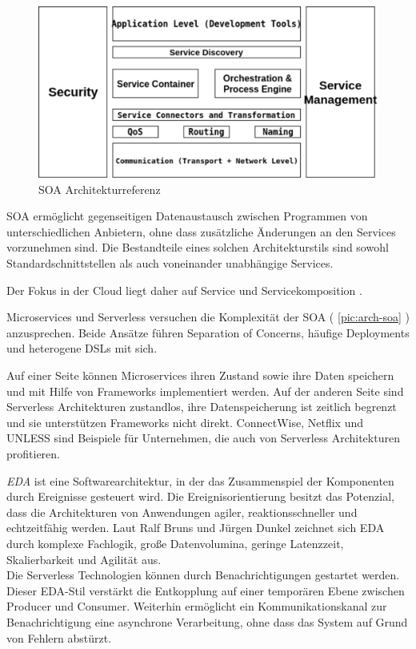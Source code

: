\documentclass[
12pt,
english,
ngerman,
headsepline,
twoside,
openright,
numbers=noenddot,version=first
]{scrreprt}
\begin{document}
\begin{figure}[H]
	\centering	
	\includegraphics[scale=0.80]{./pics/arch-soa.eps}
	\caption{SOA Architekturreferenz\cite{archSoa}}
	\label{pic:arch-soa}
\end{figure}


SOA ermöglicht gegenseitigen Datenaustausch zwischen Programmen von unterschiedlichen Anbietern, ohne dass zusätzliche Änderungen an den Services vorzunehmen sind. Die Bestandteile eines solchen Architekturstils sind sowohl Standardschnittstellen als auch voneinander unabhängige Services\cite{archSoa}. 

Der Fokus in der Cloud liegt daher auf Service und Servicekomposition \cite{cloudEssentials}.

Microservices und Serverless versuchen die Komplexität der SOA ( \autoref{pic:arch-soa} ) anzusprechen. Beide Ansätze führen  Separation of Concerns, häufige Deployments und heterogene \acrfull{DSL}s mit sich.\cite{microAdv}

Auf einer Seite können Microservices ihren Zustand sowie ihre Daten speichern und mit Hilfe von Frameworks implementiert werden. Auf der anderen Seite sind Serverless Architekturen zustandlos, ihre Datenspeicherung ist zeitlich begrenzt und sie unterstützen Frameworks nicht direkt. ConnectWise\cite{ConnectWise}, Netflix\cite{Netflix} und UNLESS\cite{UNLESS} sind Beispiele für Unternehmen, die auch von Serverless Architekturen profitieren.


\textit{\acrfull{EDA}}\label{sec:eda} ist eine Softwarearchitektur, in der das Zusammenspiel der Komponenten durch Ereignisse gesteuert wird. Die Ereignisorientierung besitzt das Potenzial, dass die Architekturen von Anwendungen agiler, reaktionsschneller und
echtzeitfähig werden. Laut Ralf Bruns und Jürgen Dunkel zeichnet sich \acrshort{EDA} durch komplexe Fachlogik, große Datenvolumina, geringe Latenzzeit, Skalierbarkeit und Agilität aus.\cite{archEDA}\\
Die Serverless Technologien können durch Benachrichtigungen gestartet werden. Dieser \acrshort{EDA}-Stil verstärkt die Entkopplung auf einer temporären Ebene zwischen Producer und Consumer. Weiterhin ermöglicht ein Kommunikationskanal zur Benachrichtigung eine asynchrone Verarbeitung, ohne dass das System auf Grund von Fehlern abstürzt. \cite{patternIntegrationEnterprise}
\end{document}
